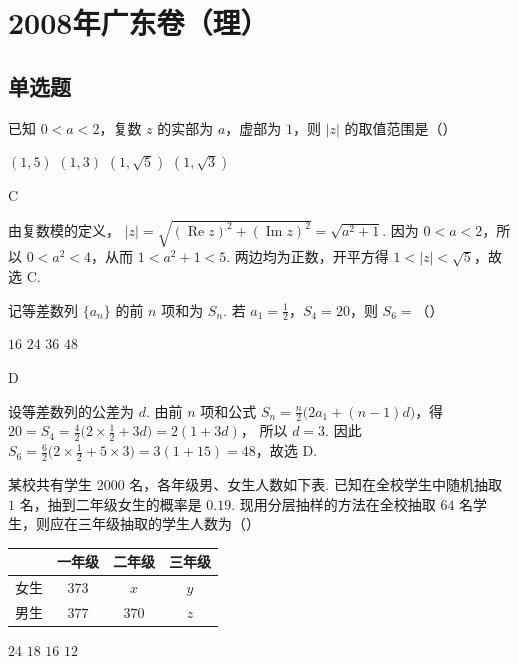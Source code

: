 \chapter{2008年广东卷（理）}

\section{单选题}

\begin{problem}
已知 \(0 < a < 2\)，复数 \(z\) 的实部为 \(a\)，虚部为 \(1\)，则 \(|z|\) 的取值范围是（\quad）

\choices
    {\((1, 5)\)}
    {\((1, 3)\)}
    {\((1, \sqrt{5})\)}
    {\((1, \sqrt{3})\)}
\end{problem}

\begin{answer}
C
\end{answer}

\begin{solution}
由复数模的定义，
\( |z|=\sqrt{(\operatorname{Re}z)^2+(\operatorname{Im}z)^2}=\sqrt{a^2+1} \).
因为 \(0<a<2\)，所以 \(0<a^2<4\)，从而
\(1<a^2+1<5\).
两边均为正数，开平方得 \(1<|z|<\sqrt{5}\)，故选 C.
\end{solution}

\begin{problem}
记等差数列 \(\{a_n\}\) 的前 \(n\) 项和为 \(S_n\). 若 \(a_1 = \frac{1}{2}\)，\(S_4 = 20\)，则 \(S_6 =\)（\quad）

\choices
    {\(16\)}
    {\(24\)}
    {\(36\)}
    {\(48\)}
\end{problem}

\begin{answer}
D
\end{answer}

\begin{solution}
设等差数列的公差为 \(d\). 由前 \(n\) 项和公式
\(S_n=\frac{n}{2}\bigl(2a_1+(n-1)d\bigr)\)，得
\(20=S_4=\frac{4}{2}\bigl(2\times\frac12+3d\bigr)=2(1+3d)\)，
所以 \(d=3\).
因此
\(S_6=\frac{6}{2}\bigl(2\times\frac12+5\times3\bigr)=3(1+15)=48\)，故选 D.
\end{solution}

\begin{problem}
某校共有学生 \(2000\text{ 名}\)，各年级男、女生人数如下表. 已知在全校学生中随机抽取 \(1\text{ 名}\)，抽到二年级女生的概率是 \(0.19\). 现用分层抽样的方法在全校抽取 \(64\text{ 名}\)学生，则应在三年级抽取的学生人数为（\quad）

\begin{center}
\begin{tabular}{c|ccc}
\hline
 & 一年级 & 二年级 & 三年级 \\
\hline
女生 & \(373\) & \(x\) & \(y\) \\
男生 & \(377\) & \(370\) & \(z\) \\
\hline
\end{tabular}
\end{center}

\choices
    {\(24\)}
    {\(18\)}
    {\(16\)}
    {\(12\)}
\end{problem}

